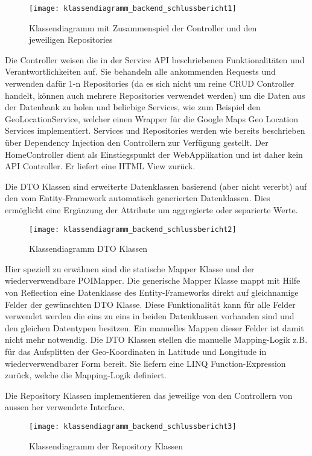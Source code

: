 \begin{figure}
  \centering
  \texttt{[image: klassendiagramm\_backend\_schlussbericht1]}
  \caption{Klassendiagramm mit Zusammenspiel der Controller und den jeweiligen Repositories}
\end{figure}

Die Controller weisen die in der Service API beschriebenen Funktionalit\"aten und Verantwortlichkeiten auf. Sie
behandeln alle ankommenden Requests und verwenden daf\"ur 1-n Repositories (da es sich nicht um reine CRUD Controller
handelt, k\"onnen auch mehrere Repositories verwendet werden) um die Daten aus der Datenbank zu holen und beliebige
Services, wie zum Beispiel den GeoLocationService, welcher einen Wrapper f\"ur die Google Maps Geo Location Services
implementiert. Services und Repositories werden wie bereits beschrieben \"uber Dependency Injection den Controllern zur
Verf\"ugung gestellt. Der HomeController dient als Einstiegspunkt der WebApplikation und ist daher kein API Controller.
Er liefert eine HTML View zur\"uck.

Die DTO Klassen sind erweiterte Datenklassen basierend (aber nicht vererbt) auf den vom Entity-Framework automatisch
generierten Datenklassen. Dies erm\"oglicht eine Erg\"anzung der Attribute um aggregierte oder separierte Werte.

\begin{figure}
  \centering
  \texttt{[image: klassendiagramm\_backend\_schlussbericht2]}
  \caption{Klassendiagramm DTO Klassen}
\end{figure}

Hier speziell zu erw\"ahnen sind die statische Mapper Klasse und der wiederverwendbare POIMapper. Die generische Mapper
Klasse mappt mit Hilfe von Reflection eine Datenklasse des Entity-Frameworks direkt auf gleichnamige Felder der
gew\"unschten DTO Klasse. Diese Funktionalit\"at kann f\"ur alle Felder verwendet werden die eins zu eins in beiden
Datenklassen vorhanden sind und den gleichen Datentypen besitzen. Ein manuelles Mappen dieser Felder ist damit nicht
mehr notwendig. Die DTO Klassen stellen die manuelle Mapping-Logik z.B. f\"ur das Aufsplitten der Geo-Koordinaten in
Latitude und Longitude in wiederverwendbarer Form bereit. Sie liefern eine LINQ Function-Expression zur\"uck, welche die
Mapping-Logik definiert.

\newpage
Die Repository Klassen implementieren das jeweilige von den Controllern von aussen her verwendete Interface.

\begin{figure}
  \texttt{[image: klassendiagramm\_backend\_schlussbericht3]}
  \caption{Klassendiagramm der Repository Klassen}
\end{figure}

